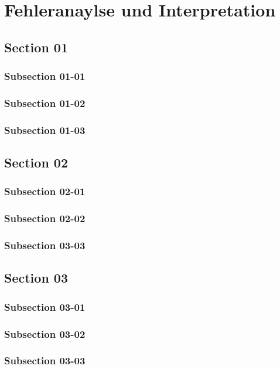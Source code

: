 \chapter{Fehleranaylse und Interpretation}

\bt

\section{Section 01}
\bt
\subsection{Subsection 01-01}
\bt
\subsection{Subsection 01-02}
\bt 
\subsection{Subsection 01-03}

\section{Section 02}
\bt
\subsection{Subsection 02-01}
\bt
\subsection{Subsection 02-02}
\bt
\subsection{Subsection 03-03}
\bt

\section{Section 03}
\bt
\subsection{Subsection 03-01}
\bt
\subsection{Subsection 03-02}
\bt
\subsection{Subsection 03-03}
\bt
